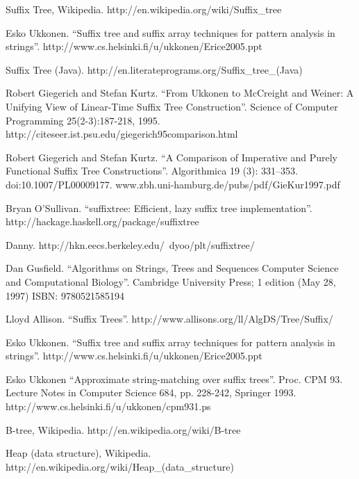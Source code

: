 \documentclass[UTF8]{article}
\begin{document}
\begin{thebibliography}{99}
Suffix Tree, Wikipedia. http://en.wikipedia.org/wiki/Suffix\_tree

Esko Ukkonen. ``Suffix tree and suffix array techniques for pattern analysis in strings''. http://www.cs.helsinki.fi/u/ukkonen/Erice2005.ppt

Suffix Tree (Java). http://en.literateprograms.org/Suffix\_tree\_(Java)

Robert Giegerich and Stefan Kurtz. ``From Ukkonen to McCreight and Weiner: A Unifying View of Linear-Time Suffix Tree Construction''. Science of Computer Programming 25(2-3):187-218, 1995. http://citeseer.ist.psu.edu/giegerich95comparison.html

Robert Giegerich and Stefan Kurtz. ``A Comparison of Imperative and Purely Functional Suffix Tree Constructions''. Algorithmica 19 (3): 331--353. doi:10.1007/PL00009177. www.zbh.uni-hamburg.de/pubs/pdf/GieKur1997.pdf

Bryan O'Sullivan. ``suffixtree: Efficient, lazy suffix tree implementation''. http://hackage.haskell.org/package/suffixtree

Danny. http://hkn.eecs.berkeley.edu/~dyoo/plt/suffixtree/

Dan Gusfield. ``Algorithms on Strings, Trees and Sequences Computer Science and Computational Biology''. Cambridge University Press; 1 edition (May 28, 1997) ISBN: 9780521585194

Lloyd Allison. ``Suffix Trees''. http://www.allisons.org/ll/AlgDS/Tree/Suffix/

Esko Ukkonen. ``Suffix tree and suffix array techniques for pattern analysis in strings''. http://www.cs.helsinki.fi/u/ukkonen/Erice2005.ppt

Esko Ukkonen ``Approximate string-matching over suffix trees''. Proc. CPM 93. Lecture Notes in Computer Science 684, pp. 228-242, Springer 1993. http://www.cs.helsinki.fi/u/ukkonen/cpm931.ps


B-tree, Wikipedia. http://en.wikipedia.org/wiki/B-tree


Heap (data structure), Wikipedia. http://en.wikipedia.org/wiki/Heap\_(data\_structure)


\end{thebibliography}
\end{document}
